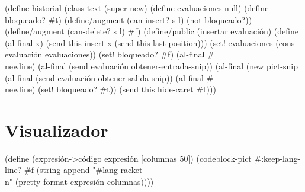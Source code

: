 \documentclass[10pt,oneside,openany,letterpaper]{book}
\begin{document}
(define historial%
  (class text%
    (super-new)
    (define evaluaciones null)
    (define bloqueado? #t)
    (define/augment (can-insert? s l) (not bloqueado?))
    (define/augment (can-delete? s l) #f)
    (define/public (insertar evaluación)
      (define (al-final x)
        (send this insert x (send this last-position)))
      (set! evaluaciones (cons evaluación evaluaciones))
      (set! bloqueado? #f)
      (al-final #\\newline)
      (al-final (send evaluación obtener-entrada-snip))
      (al-final (new pict-snip%
      (al-final (send evaluación obtener-salida-snip))
      (al-final #\\newline)
      (set! bloqueado? #t))
    (send this hide-caret #t)))
\eatline
{}\nwendcode{}\nwdocspar
\section{Visualizador}


\nwenddocs{}\endmoddef
(define (expresión->código expresión [columnas 50])
  (codeblock-pict
   #:keep-lang-line? #f
   (string-append "#lang racket\\n"
                  (pretty-format expresión columnas))))
\end{document}
